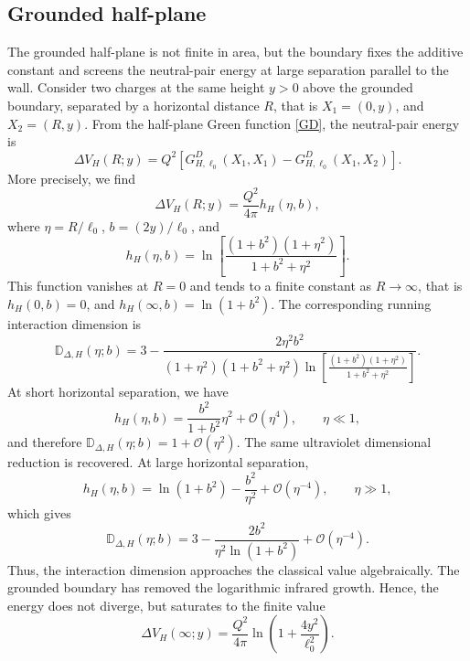 \documentclass[openacc]{rsproca_new}%
\begin{document}
\subsection{Grounded half-plane}
\label{subsec:running_dimension_halfplane}

The grounded half-plane is not finite in area, but the boundary fixes the additive constant and screens the neutral-pair energy at large separation parallel to the wall. Consider two charges at the same height $y>0$ above the grounded boundary, separated by a horizontal distance $R$, that is  $X_1=(0,y)$, and $X_2=(R,y)$. From the half-plane Green function \eqref{GD}, the neutral-pair energy is
\begin{equation}
  \Delta V_H(R;y)=Q^2\left[G_{H,\ell_0}^D(X_1,X_1)-G_{H,\ell_0}^D(X_1,X_2)\right].
\end{equation}
More precisely, we find
\begin{equation}
  \Delta V_H(R;y)=\frac{Q^2}{4\pi}h_H(\eta,b),
\end{equation}
where $\eta=R/\ell_0$, $b=(2y)/\ell_0$, and
\begin{equation}
  h_H(\eta,b)=\ln\left[\frac{(1+b^2)(1+\eta^2)}{1+b^2+\eta^2}\right].
\end{equation}
This function vanishes at $R=0$ and tends to a finite constant as $R\to\infty$, that is $h_H(0,b)=0$, and $h_H(\infty,b)=\ln(1+b^2)$. The corresponding running interaction dimension is
\begin{equation}
  \mathbb D_{\Delta,H}(\eta;b)=3-\frac{2\eta^2 b^2}{(1+\eta^2)(1+b^2+\eta^2)\ln\left[\frac{(1+b^2)(1+\eta^2)}{1+b^2+\eta^2}\right]}.
\end{equation}
At short horizontal separation, we have
\begin{equation}
  h_H(\eta,b)=\frac{b^2}{1+b^2}\eta^2+\mathcal{O}(\eta^4),\qquad\eta\ll 1,
\end{equation}
and therefore $\mathbb D_{\Delta,H}(\eta;b)=1+\mathcal{O}(\eta^2)$. The same ultraviolet dimensional reduction is recovered. At large horizontal separation,
\begin{equation}
h_H(\eta,b)=\ln(1+b^2)-\frac{b^2}{\eta^2}+\mathcal{O}(\eta^{-4}),\qquad\eta\gg 1,
\end{equation}
which gives
\begin{equation}
\mathbb D_{\Delta,H}(\eta;b)=3-\frac{2b^2}{\eta^2\ln(1+b^2)}+\mathcal{O}(\eta^{-4}).
\end{equation}
Thus, the interaction dimension approaches the classical value algebraically. The grounded boundary has removed the logarithmic infrared growth. Hence, the energy does not diverge, but saturates to the finite value
\begin{equation}
  \Delta V_H(\infty;y)=\frac{Q^2}{4\pi}\ln\left(1+\frac{4y^2}{\ell_0^2}\right).
\end{equation}
\end{document}
